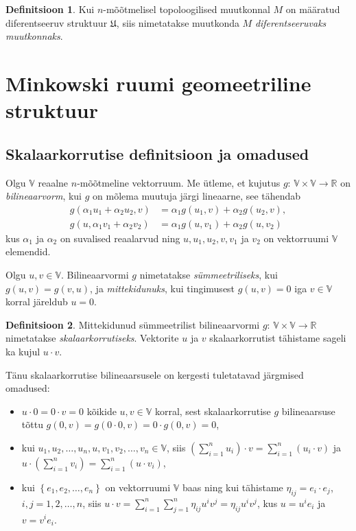 \documentclass[12pt,a4paper,oneside]{article}
\theoremstyle{plain}
\theoremstyle{definition}
\newtheorem{definitsioon}{Definitsioon}[section]
\numberwithin{equation}{section}
\def\R{{\mathbb R}}
\def\V{{\mathbb V}}
\begin{document}
\begin{definitsioon}
Kui $n$-mõõtmelisel topoloogilised muutkonnal $M$ on mää\-ratud 
diferentseeruv struktuur $\mathfrak{U}$, siis nimetatakse muutkonda 
$M$ \emph{diferentseeruvaks muutkonnaks}.
\end{definitsioon}

\newpage
\section{Minkowski ruumi geomeetriline struktuur}

\subsection{Skalaarkorrutise definitsioon ja omadused}

Olgu $\V$ reaalne $n$-mõõtmeline vektorruum. 
Me ütleme, et kujutus $g \colon\, \V \times \V 
\rightarrow \R$ on \emph{bilineaarvorm}, kui $g$ on mõlema muutuja 
järgi lineaarne, see tähendab 
\begin{align*}
g \left( \alpha_1 u_1 + \alpha_2 u_2, v \right) &= 
\alpha_1 g \left( u_1, v \right) + \alpha_2 g \left( u_2, v \right), \\
g \left( u, \alpha_1 v_1 + \alpha_2 v_2 \right) &= 
\alpha_1 g \left( u, v_1 \right) + \alpha_2 g \left( u, v_2 \right)
\end{align*}
kus $\alpha_1$ ja $\alpha_2$ on suvalised reaalarvud ning 
$u, u_1, u_2, v, v_1$ ja $v_2$ on vektorruumi $\V$ elemendid. 

Olgu $u, v \in \V$. Bilineaarvormi $g$ nimetatakse 
\emph{sümmeetriliseks}, kui $g \left( u, v \right) = 
g \left(v, u \right)$, ja \emph{mittekidunuks}, kui tingimusest 
$g \left( u, v \right) = 0$ iga $v \in \V$ korral järeldub  
$u = 0$.

\begin{definitsioon}
Mittekidunud sümmeetrilist bilineaarvormi 
$g \colon\, \V \times \V \rightarrow \R$ 
nimetatakse \emph{skalaarkorrutiseks}. Vektorite $u$ ja $v$ 
skalaarkorrutist tähistame sageli ka kujul $u \cdot v$.
\end{definitsioon}

Tänu skalaarkorrutise bilineaarsusele on kergesti tuletatavad 
järgmised oma\-dused:
\begin{itemize}
\item $u \cdot 0 = 0 \cdot v = 0$ kõikide $u, v \in \V$ 
korral, sest skalaarkorrutise $g$ bilineaarsuse tõttu $g \left(0, v\right) = 
g \left(0 \cdot 0, v \right) = 0 \cdot g \left(0, v \right) = 0$,
\item kui $u_1, u_2, \dots, u_n, u, v_1, v_2, \dots, v_n \in 
\V$, siis $\left( \sum_{i = 1}^{n} u_i \right) \cdot v = 
\sum_{i = 1}^{n}  \left( u_i \cdot v \right)$ ja 
$u \cdot \left( \sum_{i = 1}^{n} v_i \right) = 
\sum_{i = 1}^{n}  \left( u \cdot v_i \right)$,
\item kui $\left\lbrace e_1, e_2, \dots, e_n \right\rbrace$ on 
vektorruumi $\V$ baas ning kui tähistame $\eta_{ij} = 
e_i \cdot e_j$, $i,j = 1, 2, \dots, n$, siis $u \cdot v = 
\sum_{i = 1}^{n} \sum_{j = 1}^{n} \eta_{ij} u^i v^j = 
\eta_{ij} u^i v^j$, kus $u = u^i e_i$ ja $v = v^i e_i$.
\end{itemize}
\end{document}
